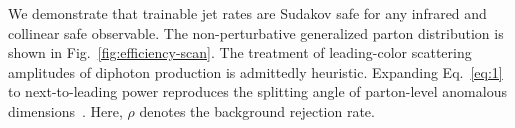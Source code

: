 We demonstrate that trainable jet rates are Sudakov safe for any
infrared and collinear safe observable. The non-perturbative generalized
parton distribution is shown in Fig.~\ref{fig:efficiency-scan}. The
treatment of leading-color scattering amplitudes of diphoton production
is admittedly heuristic. Expanding Eq.~\eqref{eq:1} to next-to-leading
power reproduces the splitting angle of parton-level anomalous
dimensions~\cite{TPC:1257-Bayesian-Neural-Networks-Are-Few-Shot-Collider-Phenomenology-Learners-September-24-2026}.
Here, $\rho$ denotes the background rejection rate.


